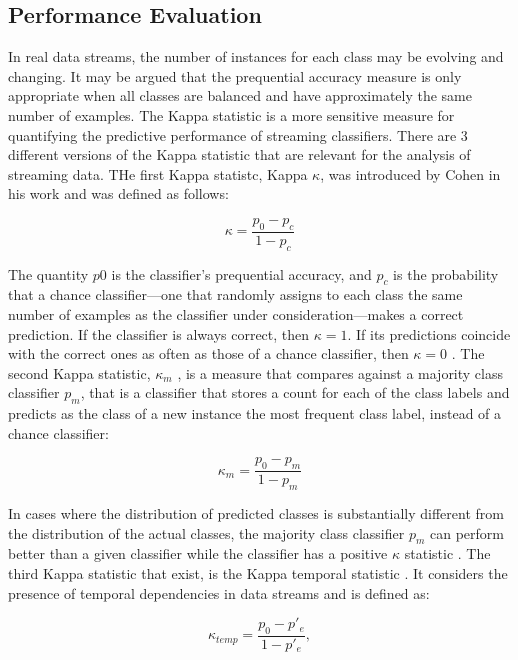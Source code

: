 \documentclass[12pt,oneside,a4paper,parskip]{scrbook}
\begin{document}
\subsection{Performance Evaluation}
In real data streams, the number of instances for each class may be evolving and changing. It may be argued that the 
prequential accuracy measure is only appropriate when all classes are balanced and have approximately the same number 
of examples. The Kappa statistic is a more sensitive measure for quantifying the predictive performance of streaming 
classifiers. \cite{MLonDataStreams}
There are 3 different versions of the Kappa statistic that are relevant for the analysis of streaming data.
THe first Kappa statistc, Kappa $\kappa$, was introduced by Cohen in his work \cite{kappak} and was defined as follows:

\begin{equation}
  \kappa = \frac{p_0-p_c}{1-p_c}
\end{equation}

The quantity $p0$ is the classifier’s prequential accuracy, and $p_c$  is the probability that a chance classifier—one
that randomly assigns to each class the same number of examples as the classifier under consideration—makes a correct 
prediction. If the classifier is always correct, then $\kappa = 1$. If its predictions coincide with the correct ones 
as often as those of a chance classifier, then $\kappa = 0$ \cite{MLonDataStreams}.
The second Kappa statistic, $\kappa_m$ \cite{kappam}, is a measure that compares against a majority class classifier $p_m$,
that is a classifier that stores a count for each of the class labels and predicts as the class of a new instance the most 
frequent class label, instead of a chance classifier:

\begin{equation}
  \kappa_m = \frac{p_0-p_m}{1-p_m}
\end{equation}

In cases where the distribution of predicted classes is substantially different from the distribution of the actual classes, 
the majority class classifier $p_m$ can perform better than a given classifier while the classifier has a positive $\kappa$ statistic \cite{MLonDataStreams}.
The third Kappa statistic that exist, is the Kappa temporal statistic \cite{kappatemp1,kappatemp2}.
It considers the presence of temporal dependencies in data streams and is defined as:

\begin{equation}
  \kappa_\textit{temp} = \frac{p_0-p'_e}{1-p'_e},
\end{equation}
\end{document}
